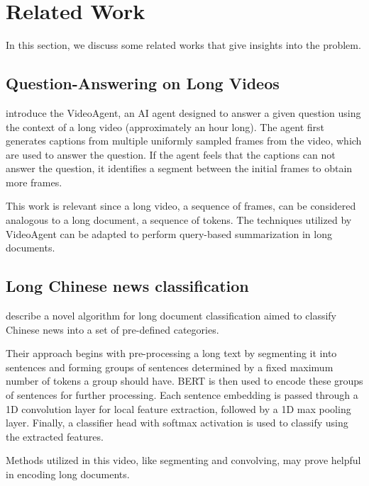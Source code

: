 \section{Related Work}
\label{sec:related-work}

In this section, we discuss some related works that give insights into the problem.


\subsection*{Question-Answering on Long Videos}
\label{sub:long-videos}

\citet{wang2024videoagent} introduce the VideoAgent, an AI agent designed to answer a
given question using the context of a long video (approximately an hour long).
The agent first generates captions from multiple uniformly sampled frames from the
video, which are used to answer the question.
If the agent feels that the captions can not answer the question, it identifies a
segment between the initial frames to obtain more frames.

This work is relevant since a long video, a sequence of frames, can be considered
analogous to a long document, a sequence of tokens. The techniques utilized by
VideoAgent can be adapted to perform query-based summarization in long documents.


\subsection*{Long Chinese news classification}
\label{sub:chinese}

\citet{chen2022long} describe a novel algorithm for long document classification
aimed to classify Chinese news into a set of pre-defined categories.

Their approach begins with pre-processing a long text by segmenting it into sentences
and forming groups of sentences determined by a fixed maximum number of tokens a
group should have.
BERT is then used to encode these groups of sentences for further processing.
Each sentence embedding is passed through a 1D convolution layer for local feature
extraction, followed by a 1D max pooling layer.
Finally, a classifier head with softmax activation is used to classify using the
extracted features.

Methods utilized in this video, like segmenting and convolving, may prove helpful in
encoding long documents.
